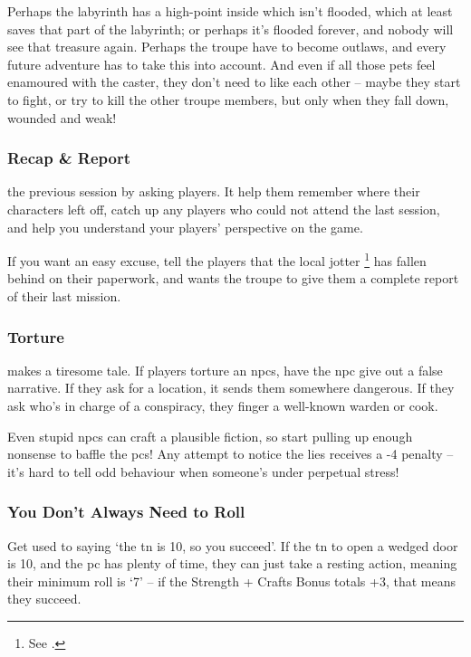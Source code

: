 \begin{multicols}{2}
Perhaps the labyrinth has a high-point inside which isn't flooded, which at least saves that part of the labyrinth; or perhaps it's flooded forever, and nobody will see that treasure again.
Perhaps the troupe have to become outlaws, and every future adventure has to take this into account.
And even if all those pets feel enamoured with the caster, they don't need to like each other -- maybe they start to fight, or try to kill the other troupe members, but only when they fall down, wounded and weak!

\subsubsection{Recap \& Report}
the previous session by asking players.
It help them remember where their characters left off, catch up any players who could not attend the last session, and help you understand your players' perspective on the game.

If you want an easy excuse, tell the players that the local \gls{jotter}%
\footnote{See .}
has fallen behind on their paperwork, and wants the troupe to give them a complete report of their last mission.

\subsubsection{Torture}
makes a tiresome tale.
If players torture an \glspl{npc}, have the \gls{npc} give out a false narrative.
If they ask for a location, it sends them somewhere dangerous.
If they ask who's in charge of a conspiracy, they finger a well-known \gls{warden} or cook.

Even stupid \glspl{npc} can craft a plausible fiction, so start pulling up enough nonsense to baffle the \glspl{pc}!
Any attempt to notice the lies receives a -4 penalty -- it's hard to tell odd behaviour when someone's under perpetual stress!

\subsubsection{You Don't Always Need to Roll}

Get used to saying `the \gls{tn} is 10, so you succeed'.
If the \gls{tn} to open a wedged door is 10, and the \gls{pc} has plenty of time, they can just take a resting action, meaning their minimum roll is `7' -- if the Strength + Crafts Bonus totals +3, that means they succeed.


\end{multicols}
